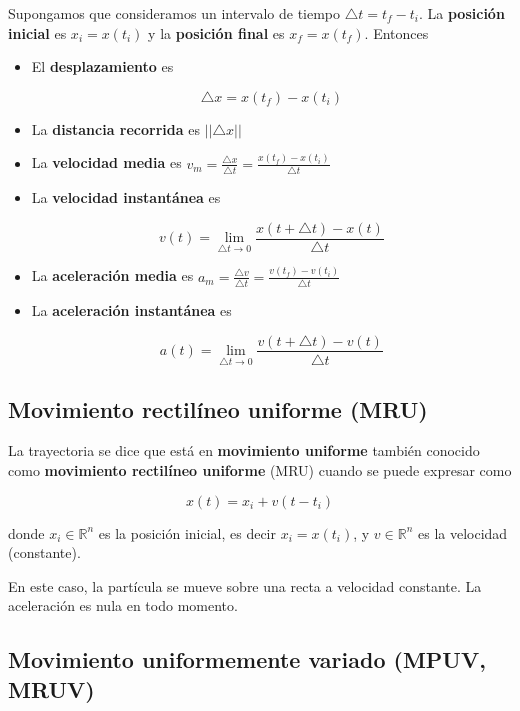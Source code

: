 Supongamos que consideramos un intervalo de tiempo $\triangle t = t_f - t_i$.  La \textbf{posición inicial} es $ x_i = x(t_i)$ y la \textbf{posición final} es $x_f = x(t_f)$.  Entonces

\begin{itemize}
\item El \textbf{desplazamiento} es 

$$\triangle x = x(t_f) - x(t_i)$$  

\item La \textbf{distancia recorrida} es $||\triangle x||$

\item La \textbf{velocidad media} es $ v_m = \frac{\triangle x}{ \triangle t} = \frac{x(t_f) - x(t_i)}{\triangle t}$

\item La \textbf{velocidad instantánea} es 

$$ v(t) = \lim_{\triangle t \to 0} \frac{x(t + \triangle t) - x(t)}{\triangle t}$$

\item La \textbf{aceleración media} es $ a_m = \frac{\triangle v}{ \triangle t} = \frac{v(t_f) - v(t_i)}{\triangle t}$

\item La \textbf{aceleración instantánea} es 

$$ a(t) = \lim_{\triangle t \to 0} \frac{v(t+\triangle t) - v(t)}{\triangle t}$$

\end{itemize}

\subsection{Movimiento rectilíneo uniforme (MRU)}

La trayectoria se dice que está en \textbf{movimiento uniforme} también conocido como \textbf{movimiento rectilíneo uniforme} (MRU)  cuando se puede expresar como

$$ x(t) = x_i + v (t - t_i) $$

donde $x_i \in \mathbb{R}^n$ es la posición inicial, es decir $x_i = x(t_i)$, y $v \in \mathbb{R}^n$ es la velocidad (constante).

En este caso, la partícula se mueve sobre una recta a velocidad constante.  La aceleración es nula en todo momento.

\subsection{Movimiento uniformemente variado (MPUV, MRUV)}

